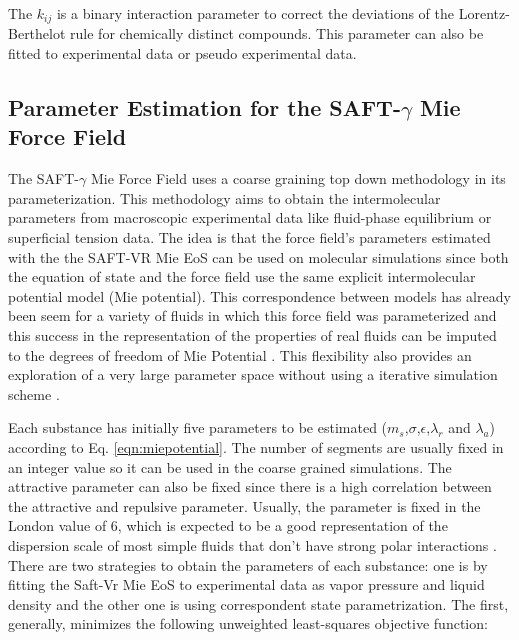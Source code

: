 The $k_{ij}$ is a binary interaction parameter to correct the deviations of the Lorentz-Berthelot rule for chemically distinct compounds. This parameter can also be fitted to experimental data or pseudo experimental data.

\subsection{Parameter Estimation for the SAFT-$\gamma$ Mie Force Field}\label{parsaft}

The SAFT-$\gamma$ Mie Force Field uses a coarse graining top down methodology in its parameterization. This methodology aims to obtain the intermolecular parameters from macroscopic experimental data like fluid-phase equilibrium or superficial tension data. The idea is that the force field's  parameters estimated with the the SAFT-VR Mie EoS can be used on molecular simulations since both the equation of state and the force field use the same explicit intermolecular potential model (Mie potential). This correspondence between models has already been seem for a variety of fluids in which this force field was parameterized and  this success in the representation of the properties of real fluids can be imputed to the degrees of freedom of Mie Potential \cite{herdes2015}. This flexibility also provides an exploration of a very large parameter space without using a iterative simulation scheme \cite{avendano2011}. 

Each substance has initially five parameters to be estimated ($m_s$,$\sigma$,$\epsilon$,$\lambda_{r}$ and $\lambda_{a}$) according to Eq. \eqref{eqn:miepotential}. The number of segments are usually fixed in an integer value so it can be used in the coarse grained simulations. The attractive parameter can also be fixed since there is a high correlation between the attractive and repulsive parameter. Usually, the parameter is fixed in the London value of 6, which is expected to be a good representation of the dispersion scale of most simple fluids that don't have strong polar interactions \cite{ramrattan2015,herdes2015}. There are two strategies to obtain the parameters of each substance: one is by fitting the Saft-Vr Mie EoS to experimental data as vapor pressure and liquid density and the other one is using correspondent state parametrization. The first, generally, minimizes the following unweighted least-squares objective function:

